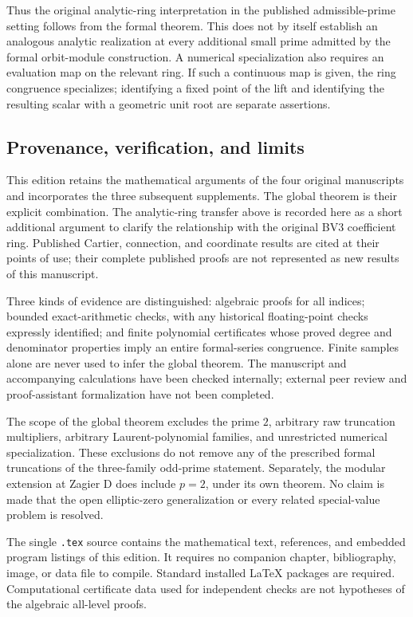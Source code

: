 \documentclass[11pt,a4paper]{article}
\theoremstyle{definition}\newtheorem{definition}[theorem]{Definition}
\theoremstyle{remark}\newtheorem{remark}[theorem]{Remark}
\numberwithin{equation}{section}
\begin{document}
Thus the original analytic-ring interpretation in the published
admissible-prime setting follows from the formal theorem. This
does not by itself establish an analogous analytic realization at
every additional small prime admitted by the formal orbit-module
construction. A numerical specialization also requires an evaluation
map on the relevant ring. If such a continuous map is given, the
ring congruence specializes; identifying a fixed point of the lift
and identifying the resulting scalar with a geometric unit root
are separate assertions.

\subsection{Provenance, verification, and limits}
This edition retains the mathematical arguments of the four
original manuscripts and incorporates the three subsequent
supplements. The global theorem is their explicit combination.
The analytic-ring transfer above is recorded here as a short
additional argument to clarify the relationship with the original
BV3 coefficient ring. Published Cartier, connection, and coordinate
results are cited at their points of use; their complete published
proofs are not represented as new results of this manuscript.

Three kinds of evidence are distinguished: algebraic proofs for
all indices; bounded exact-arithmetic checks, with any historical
floating-point checks expressly identified; and finite polynomial
certificates whose proved degree and denominator properties imply
an entire formal-series congruence. Finite samples alone are never
used to infer the global theorem. The manuscript and accompanying
calculations have been checked internally; external peer review
and proof-assistant formalization have not been completed.

The scope of the global theorem excludes the prime $2$, arbitrary
raw truncation multipliers, arbitrary Laurent-polynomial families,
and unrestricted numerical specialization. These exclusions do not
remove any of the prescribed formal truncations of the three-family
odd-prime statement. Separately, the modular extension at Zagier D
does include $p=2$, under its own theorem. No claim is made that the
open elliptic-zero generalization or every related special-value
problem is resolved.

The single \texttt{.tex} source contains the mathematical text,
references, and embedded program listings of this edition. It
requires no companion chapter, bibliography, image, or data file
to compile. Standard installed LaTeX packages are required.
Computational certificate data used for independent checks are
not hypotheses of the algebraic all-level proofs.
\end{document}
